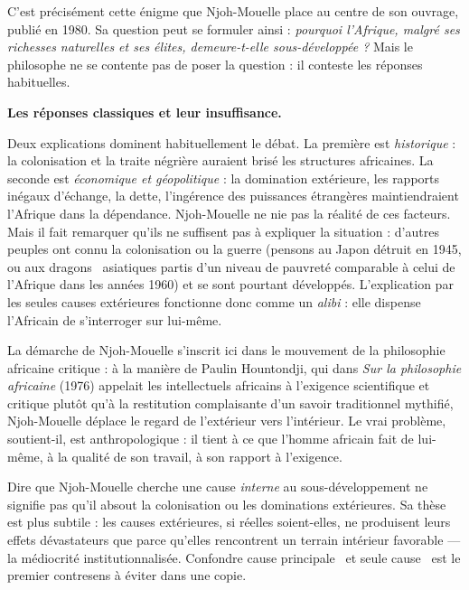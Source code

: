 \documentclass[11pt]{article}
\newcommand{\cle}[1]{{\popxbold\color{popdark}#1}}
\begin{document}
C'est précisément cette énigme que Njoh-Mouelle place au centre de son ouvrage, publié en 1980. Sa question peut se formuler ainsi : \emph{pourquoi l'Afrique, malgré ses richesses naturelles et ses élites, demeure-t-elle sous-développée ?} Mais le philosophe ne se contente pas de poser la question : il conteste les réponses habituelles.

\textbf{Les réponses classiques et leur insuffisance.}\par
Deux explications dominent habituellement le débat. La première est \emph{historique} : la colonisation et la traite négrière auraient brisé les structures africaines. La seconde est \emph{économique et géopolitique} : la domination extérieure, les rapports inégaux d'échange, la dette, l'ingérence des puissances étrangères maintiendraient l'Afrique dans la dépendance. Njoh-Mouelle ne nie pas la réalité de ces facteurs. Mais il fait remarquer qu'ils ne suffisent pas à expliquer la situation : d'autres peuples ont connu la colonisation ou la guerre (pensons au Japon détruit en 1945, ou aux \guillemotleft dragons \guillemotright\ asiatiques partis d'un niveau de pauvreté comparable à celui de l'Afrique dans les années 1960) et se sont pourtant développés. L'explication par les seules causes extérieures fonctionne donc comme un \emph{alibi} : elle dispense l'Africain de s'interroger sur lui-même.

La démarche de Njoh-Mouelle s'inscrit ici dans le mouvement de la philosophie africaine critique : à la manière de Paulin Hountondji, qui dans \emph{Sur la \guillemotleft philosophie africaine \guillemotright} (1976) appelait les intellectuels africains à l'exigence scientifique et critique plutôt qu'à la restitution complaisante d'un savoir traditionnel mythifié, Njoh-Mouelle déplace le regard de l'extérieur vers l'intérieur. Le vrai problème, soutient-il, est \cle{anthropologique} : il tient à ce que l'homme africain fait de lui-même, à la qualité de son travail, à son rapport à l'exigence.

\begin{attention}
Dire que Njoh-Mouelle cherche une cause \emph{interne} au sous-développement ne signifie pas qu'il absout la colonisation ou les dominations extérieures. Sa thèse est plus subtile : les causes extérieures, si réelles soient-elles, ne produisent leurs effets dévastateurs que parce qu'elles rencontrent un terrain intérieur favorable — la médiocrité institutionnalisée. Confondre \guillemotleft cause principale \guillemotright\ et \guillemotleft seule cause \guillemotright\ est le premier contresens à éviter dans une copie.
\end{attention}
\end{document}
